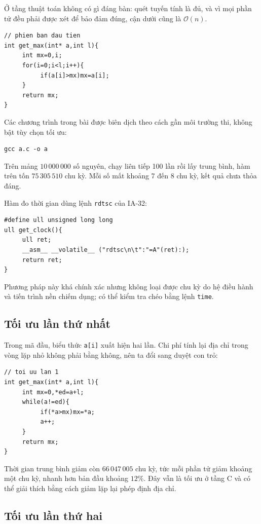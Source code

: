 \documentclass[11pt]{article}
\newcommand{\Oh}{\mathcal{O}}
\begin{document}
Ở tầng thuật toán không có gì đáng bàn: quét tuyến tính là đủ, và vì mọi phần
tử đều phải được xét để bảo đảm đúng, cận dưới cũng là \(\Oh(n)\).
\begin{verbatim}
// phien ban dau tien
int get_max(int* a,int l){
     int mx=0,i;
     for(i=0;i<l;i++){
          if(a[i]>mx)mx=a[i];
     }
     return mx;
}
\end{verbatim}

Các chương trình trong bài được biên dịch theo cách gần môi trường thi, không
bật tùy chọn tối ưu:
\begin{verbatim}
gcc a.c -o a
\end{verbatim}

Trên mảng \(10\,000\,000\) số nguyên, chạy liên tiếp 100 lần rồi lấy trung
bình, hàm trên tốn \(75\,305\,510\) chu kỳ. Mỗi số mất khoảng 7 đến 8 chu kỳ,
kết quả chưa thỏa đáng.

Hàm đo thời gian dùng lệnh \texttt{rdtsc} của IA-32:
\begin{verbatim}
#define ull unsigned long long
ull get_clock(){
     ull ret;
     __asm__ __volatile__ ("rdtsc\n\t":"=A"(ret):);
     return ret;
}
\end{verbatim}
Phương pháp này khá chính xác nhưng không loại được chu kỳ do hệ điều hành và
tiến trình nền chiếm dụng; có thể kiểm tra chéo bằng lệnh \texttt{time}.

\subsection{Tối ưu lần thứ nhất}

Trong mã đầu, biểu thức \texttt{a[i]} xuất hiện hai lần. Chi phí tính lại địa
chỉ trong vòng lặp nhỏ không phải bằng không, nên ta đổi sang duyệt con trỏ:
\begin{verbatim}
// toi uu lan 1
int get_max(int* a,int l){
     int mx=0,*ed=a+l;
     while(a!=ed){
          if(*a>mx)mx=*a;
          a++;
     }
     return mx;
}
\end{verbatim}

Thời gian trung bình giảm còn \(66\,047\,005\) chu kỳ, tức mỗi phần tử giảm
khoảng một chu kỳ, nhanh hơn bản đầu khoảng \(12\%\). Đây vẫn là tối ưu ở tầng
C và có thể giải thích bằng cách giảm lặp lại phép định địa chỉ.

\subsection{Tối ưu lần thứ hai}
\end{document}
